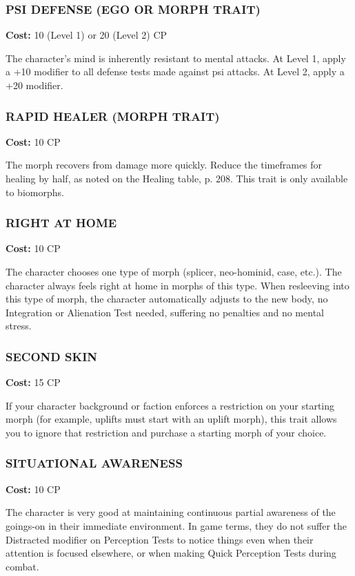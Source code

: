 \subsubsection{PSI DEFENSE (EGO OR MORPH TRAIT)}
\textbf{Cost:} 10 (Level 1) or 20 (Level 2) CP

The character’s mind is inherently resistant to mental attacks. At Level 1,
apply a +10 modifier to all defense tests made against psi attacks. At Level 2,
apply a +20 modifier.

\subsubsection{RAPID HEALER (MORPH TRAIT)}
\textbf{Cost:} 10 CP

The morph recovers from damage more quickly.  Reduce the timeframes for healing
by half, as noted on the Healing table, p. 208. This trait is only available
to biomorphs.

\subsubsection{RIGHT AT HOME}
\textbf{Cost:} 10 CP

The character chooses one type of morph (splicer, neo-hominid, case, etc.). The
character always feels right at home in morphs of this type. When resleeving
into this type of morph, the character automatically adjusts to the new body,
no Integration or Alienation Test needed, suffering no penalties and no mental
stress.

\subsubsection{SECOND SKIN}
\textbf{Cost:} 15 CP

If your character background or faction enforces a restriction on your starting
morph (for example, uplifts must start with an uplift morph), this trait
allows you to ignore that restriction and purchase a starting morph of your
choice.

\subsubsection{SITUATIONAL AWARENESS}
\textbf{Cost:} 10 CP

The character is very good at maintaining continuous partial awareness of the
goings-on in their immediate environment. In game terms, they do not suffer the
Distracted modifier on Perception Tests to notice things even when their
attention is focused elsewhere, or when making Quick Perception Tests during
combat.


